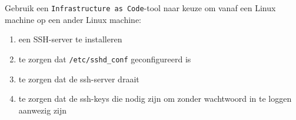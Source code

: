 Gebruik een \texttt{Infrastructure as Code}-tool naar keuze om vanaf een Linux machine op een ander Linux machine:
\begin{enumerate}
\item een SSH-server te installeren
\item te zorgen dat \texttt{/etc/sshd\_conf} geconfigureerd is
\item te zorgen dat de ssh-server draait
\item te zorgen dat de ssh-keys die nodig zijn om zonder wachtwoord in te loggen aanwezig zijn
\end{enumerate}

